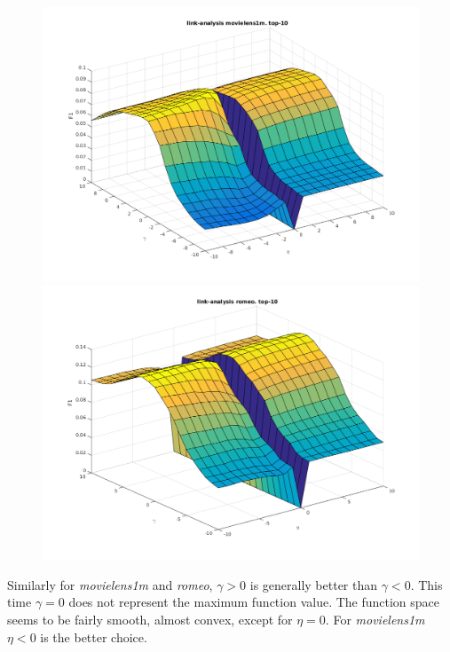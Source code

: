 \begin{figure}[h!]
\centering
\begin{minipage}{.5\textwidth}
    \centering
    \includegraphics[width=\linewidth]{fig/link_eta_gamma/movielens_link.png}
\end{minipage}%
\begin{minipage}{.5\textwidth}
    \centering
    \includegraphics[width=\linewidth]{fig/link_eta_gamma/romeo_link.png}
\end{minipage}
\end{figure}

\FloatBarrier

Similarly for \textit{movielens1m} and \textit{romeo}, $\gamma > 0$ is generally better than $\gamma < 0$. This time $\gamma = 0$ does not represent the maximum function value. The function space seems to be fairly smooth, almost convex, except for $\eta = 0$. For \textit{movielens1m} $\eta < 0$ is the better choice.

